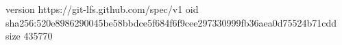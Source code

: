 version https://git-lfs.github.com/spec/v1
oid sha256:520e8986290045be58bbdce5f684f6f9cee297330999fb36aea0d75524b71cdd
size 435770
